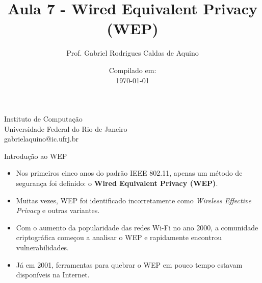 \title{Aula 7 - Wired Equivalent Privacy (WEP)}

\author{Prof. Gabriel Rodrigues Caldas de Aquino}

\institute
{
    Instituto de Computação \\
    Universidade Federal do Rio de Janeiro\\
    gabrielaquino@ic.ufrj.br%
}
\date{Compilado em: \\ \today} %




\begin{frame}
    \titlepage
\end{frame}


\begin{frame}{Introdução ao WEP}
    \begin{itemize}
        \item Nos primeiros cinco anos do padrão IEEE 802.11, apenas um método de segurança foi definido: o \textbf{Wired Equivalent Privacy (WEP)}.
        \item Muitas vezes, WEP foi identificado incorretamente como \textit{Wireless Effective Privacy} e outras variantes.
        \item Com o aumento da popularidade das redes Wi-Fi no ano 2000, a comunidade criptográfica começou a analisar o WEP e rapidamente encontrou vulnerabilidades.
        \item Já em 2001, ferramentas para quebrar o WEP em pouco tempo estavam disponíveis na Internet.
    \end{itemize}
\end{frame}

